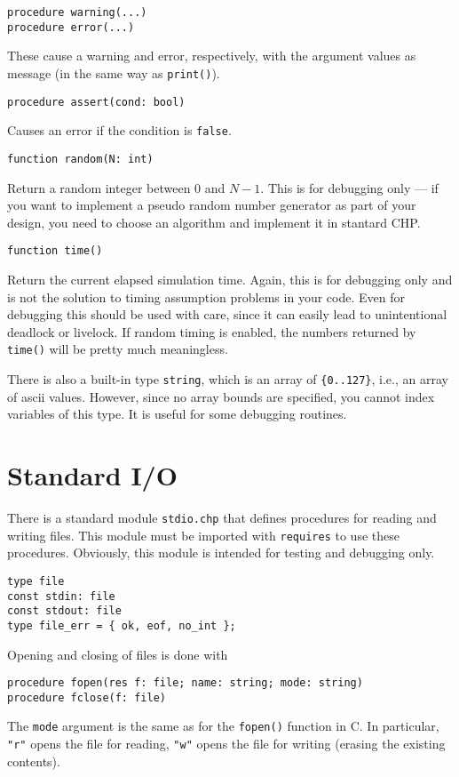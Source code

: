 \begin{verbatim}
procedure warning(...)
procedure error(...)
\end{verbatim}
These cause a warning and error, respectively, with the argument values
as message (in the same way as \verb|print()|).

\begin{verbatim}
procedure assert(cond: bool)
\end{verbatim}
Causes an error if the condition is \verb|false|.

\begin{verbatim}
function random(N: int)
\end{verbatim}
Return a random integer between $0$ and $N-1$.  This is for debugging only ---
if you want to implement a pseudo random number generator as part of your
design, you need to choose an algorithm and implement it in stantard CHP.

\begin{verbatim}
function time()
\end{verbatim}
Return the current elapsed simulation time.  Again, this is for debugging only
and is not the solution to timing assumption problems in your code.  Even for
debugging this should be used with care, since it can easily lead to
unintentional deadlock or livelock.  If random timing is enabled, the numbers
returned by \verb|time()| will be pretty much meaningless.

There is also a built-in type \verb|string|, which is an array of \verb|{0..127}|,
i.e., an array of ascii values. However, since no array bounds are specified,
you cannot index variables of this type. It is useful for some debugging
routines.

\section{Standard I/O}\label{sec:stdio}

There is a standard module \verb|stdio.chp| that defines procedures for
reading and writing files. This module must be imported with \verb|requires| to
use these procedures. Obviously, this module is intended for testing and
debugging only.
\begin{verbatim}
type file
const stdin: file
const stdout: file
type file_err = { ok, eof, no_int };
\end{verbatim}
Opening and closing of files is done with
\begin{verbatim}
procedure fopen(res f: file; name: string; mode: string)
procedure fclose(f: file)
\end{verbatim}
The \verb|mode| argument is the same as for the \verb|fopen()| function in C. In
particular, \verb|"r"| opens the file for reading, \verb|"w"| opens the file for
writing (erasing the existing contents).

